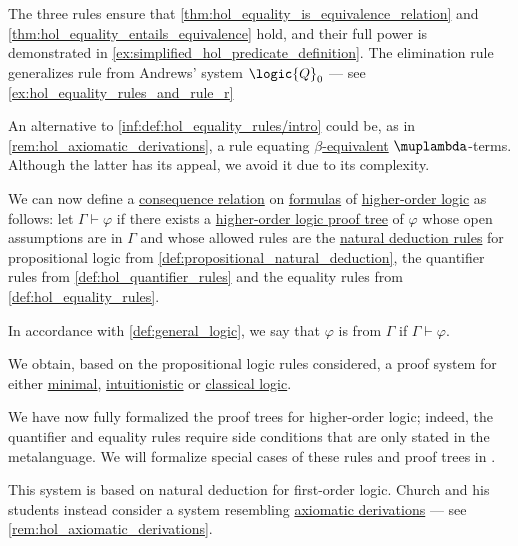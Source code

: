 \begin{comments}
  \item The three rules ensure that \cref{thm:hol_equality_is_equivalence_relation} and \cref{thm:hol_equality_entails_equivalence} hold, and their full power is demonstrated in \cref{ex:simplified_hol_predicate_definition}. The elimination rule generalizes rule  from Andrews' system \( \logic{Q}_0 \) --- see \cref{ex:hol_equality_rules_and_rule_r}

  An alternative to \ref{inf:def:hol_equality_rules/intro} could be, as in \cref{rem:hol_axiomatic_derivations}, a rule equating \hyperref[def:beta_eta_reduction]{\( \beta \)-equivalent} \( \muplambda \)-terms. Although the latter has its appeal, we avoid it due to its complexity.
\end{comments}

\begin{definition}\label{def:hol_consequence}\mimprovised
  We can now define a \hyperref[def:consequence_relation]{consequence relation} on \hyperref[def:hol_expression/formula]{formulas} of \hyperref[
def:higher_order_logic]{higher-order logic} as follows: let \( \Gamma \vdash \varphi \) if there exists a \hyperref[def:hol_natural_deduction_proof_tree]{higher-order logic proof tree} of \( \varphi \) whose open assumptions are in \( \Gamma \) and whose allowed rules are the \hyperref[def:natural_deduction_rule]{natural deduction rules} for propositional logic from \cref{def:propositional_natural_deduction}, the quantifier rules from \cref{def:hol_quantifier_rules} and the equality rules from \cref{def:hol_equality_rules}.

  In accordance with \cref{def:general_logic}, we say that \( \varphi \) is  from \( \Gamma \) if \( \Gamma \vdash \varphi \).
\end{definition}
\begin{comments}
  \item We obtain, based on the propositional logic rules considered, a proof system for either \hyperref[rem:minimal_propositional_semantics]{minimal}, \hyperref[def:truth_value_algebra/intuitionistic]{intuitionistic} or \hyperref[def:truth_value_algebra/classical]{classical logic}.

  \item We have now fully formalized the proof trees for higher-order logic; indeed, the quantifier and equality rules require side conditions that are only stated in the metalanguage. We will formalize special cases of these rules and proof trees in .

  \item This system is based on natural deduction for first-order logic. Church and his students instead consider a system resembling \hyperref[def:propositional_axiomatic_derivation_system]{axiomatic derivations} --- see \cref{rem:hol_axiomatic_derivations}.
\end{comments}

